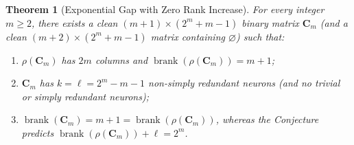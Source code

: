 \documentclass[11pt]{article}
\theoremstyle{plain}
\newtheorem{theorem}{Theorem}[section]
\theoremstyle{definition}
\theoremstyle{remark}
\DeclareMathOperator{\brank}{brank}
\begin{document}
\begin{theorem}[Exponential Gap with Zero Rank Increase]\label{thm:expgap}
For every integer $m \ge 2$, there exists a clean $(m+1) \times (2^m + m - 1)$ binary matrix $\mathbf{C}_m$ (and a clean $(m+2) \times (2^m + m - 1)$ matrix containing $\varnothing$) such that:
\begin{enumerate}[label=\textup{(\arabic*)}]
\item $\rho(\mathbf{C}_m)$ has $2m$ columns and $\brank(\rho(\mathbf{C}_m)) = m + 1$;
\item $\mathbf{C}_m$ has $k = \ell = 2^m - m - 1$ non-simply redundant neurons (and no trivial or simply redundant neurons);
\item $\brank(\mathbf{C}_m) = m + 1 = \brank(\rho(\mathbf{C}_m))$, whereas the Conjecture predicts $\brank(\rho(\mathbf{C}_m)) + \ell = 2^m$.
\end{enumerate}
\end{theorem}
\end{document}
